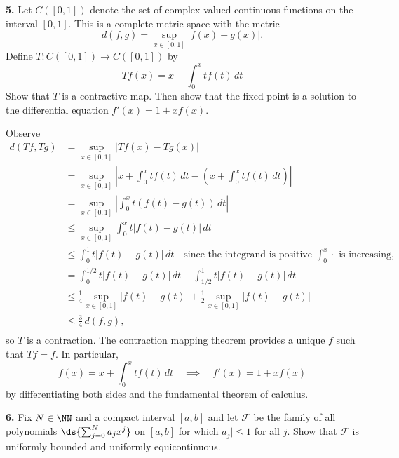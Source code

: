 \documentclass{homework}
\begin{document}
{\bf 5.} Let $C([0,1])$ denote the set of complex-valued continuous functions on the interval $[0,1]$.  This is a complete metric space with the metric 
$$
d(f,g) = \sup_{x\in[0,1]} |f(x) - g(x)|.
$$
Define $T:C([0,1]) \to C([0,1])$ by 
$$
  Tf(x) = x + \int_0^x tf(t)\,dt
$$
Show that $T$ is a contractive map.  Then show that the fixed point is a solution to the differential equation $f'(x) = 1 + xf(x)$.

\begin{solution}
  Observe
  \begin{align*}
    d(Tf,Tg) 
    &= \sup_{x\in[0,1]} |Tf(x) - Tg(x)|\\
    &= \sup_{x\in[0,1]} \left|x + \int_0^x tf(t)\,dt - \left(x + \int_0^x tf(t)\,dt\right)\right|\\
    &= \sup_{x\in[0,1]} \left|\int_0^x t(f(t)-g(t))\,dt\right|\\
    &\le \sup_{x\in[0,1]} \int_0^x t|f(t)-g(t)|\,dt\\
    &\le \int_0^1 t|f(t)-g(t)|\,dt \quad\text{since the integrand is positive $\int_0^x \cdot$ is increasing,}\\
    &=\int_0^{1/2} t|f(t)-g(t)|\,dt + \int_{1/2}^{1} t|f(t)-g(t)|\,dt\\
    &\le \frac 14 \sup_{x\in[0,1]}|f(t)-g(t)| + \frac 12 \sup_{x\in[0,1]}|f(t)-g(t)|\\
    &\le \frac 34\, d(f,g),\\
  \end{align*}
  so $T$ is a contraction. The contraction mapping theorem provides a unique $f$ such that $Tf = f$. In particular,
  $$
    f(x) = x + \int_0^x tf(t)\,dt \quad \implies \quad f'(x) = 1 + xf(x)
  $$
  by differentiating both sides and the fundamental theorem of calculus.
\end{solution}

{\bf 6.}  Fix $N\in \NN$ and a compact interval $[a,b]$ and let $\mathcal F$ be the family of all polynomials $\ds{\sum_{j=0}^Na_jx^j}$ on $[a,b]$ for which $a_j|\le 1$ for all $j$.  Show that $\mathcal F$ is uniformly bounded and uniformly equicontinuous.
\end{document}
